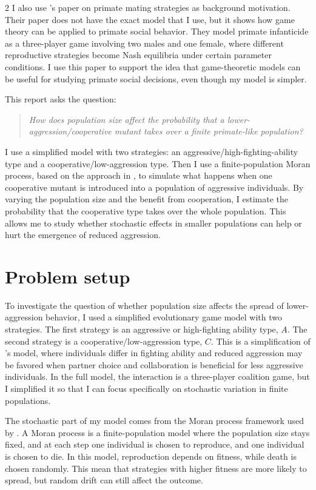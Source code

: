 \documentclass[11pt]{article}
\begin{document}
\begin{multicols}{2}
I also use \cite{Lyon2011}'s paper on primate mating strategies as background motivation. Their paper does not have the exact model that I use, but it shows how game theory can be applied to primate social behavior. They model primate infanticide as a three-player game involving two males and one female, where different reproductive strategies become Nash equilibria under certain parameter conditions. I use this paper to support the idea that game-theoretic models can be useful for studying primate social decisions, even though my model is simpler. 

\medskip 
\noindent This report asks the question: 
\begin{quote}
    \textit{How does population size affect the probability that a lower-aggression/cooperative mutant takes over a finite primate-like population?}
\end{quote}
I use a simplified model with two strategies: an aggressive/high-fighting-ability type and a cooperative/low-aggression type. Then I use a finite-population Moran process, based on the approach in \cite{Imhof2005}, to simulate what happens when one cooperative mutant is introduced into a population of aggressive individuals. By varying the population size and the benefit from cooperation, I estimate the probability that the cooperative type takes over the whole population. This allows me to study whether stochastic effects in smaller populations can help or hurt the emergence of reduced aggression. 

\section{Problem setup}

To investigate the question of whether population size affects the spread of lower-aggression behavior, I used a simplified evolutionary game model with two strategies. The first strategy is an aggressive or high-fighting ability type, $A$. The second strategy is a cooperative/low-aggression type, $C$. This is a simplification of \cite{Ihara2020}'s model, where individuals differ in fighting ability and reduced aggression may be favored when partner choice and collaboration is beneficial for less aggressive individuals. In the full model, the interaction is a three-player coalition game, but I simplified it so that I can focus specifically on stochastic variation in finite populations.

The stochastic part of my model comes from the Moran process framework used by \cite{Imhof2005}. A Moran process is a finite-population model where the population size stays fixed, and at each step one individual is chosen to reproduce, and one individual is chosen to die. In this model, reproduction depends on fitness, while death is chosen randomly. This mean that strategies with higher fitness are more likely to spread, but random drift can still affect the outcome. 


\end{multicols}
\end{document}
